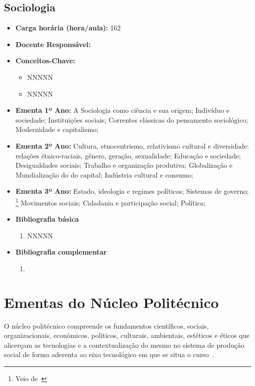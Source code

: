 \documentclass[11pt,fleqn]{book} %
\newcommand{\VER}[1]{\begingroup\color{red}#1\endgroup}
\begin{document}
\subsection{Sociologia}\label{disc:sociologia}
\begin{itemize}
	\item \textbf{Carga horária (hora/aula):} 162
	\item \textbf{Docente Responsável:}
	\item \textbf{Conceitos-Chave:}
	\begin{itemize}
		\item NNNNN
		\item NNNNN
	\end{itemize}
	\item \textbf{Ementa 1º Ano:} 
	A Sociologia como ciência e sua origem; 
	Indivíduo e sociedade; 
	Instituições sociais; 
	Correntes clássicas do pensamento sociológico; 
	Modernidade e capitalismo;
	\item \textbf{Ementa 2º Ano:} 
	Cultura, etnocentrismo, relativismo cultural e diversidade: relações étnico-raciais, gênero, geração, sexualidade;
	Educação e sociedade; 
	Desigualdades sociais; 
	Trabalho e organização produtiva; 
	Globalização e Mundialização do do capital; 
	Indústria cultural e consumo;
	\item \textbf{Ementa 3º Ano:} 
	\VER{	
	Estado, ideologia e regimes políticos; 
	Sistemas de governo;
	}\footnote{Veio de~} 
	Movimentos sociais;
	Cidadania e participação social;
	Política;
	\item \textbf{Bibliografia básica}
	\begin{enumerate}
		\item NNNNN
	\end{enumerate}
	\item \textbf{Bibliografia complementar}
	\begin{enumerate}
		\item 
	\end{enumerate}	
\end{itemize}


\newpage
\section{Ementas do Núcleo Politécnico}\label{ementasPolitecnico}
\indent

O núcleo politécnico compreende os fundamentos científicos, sociais, organizacionais, econômicos, políticos, culturais, ambientais, estéticos e éticos que alicerçam as tecnologias e a contextualização do mesmo no sistema de produção social de forma aderenta ao eixo tecnológico em que se situa o curso~\cite{Resolucao06De2012}.
\end{document}
